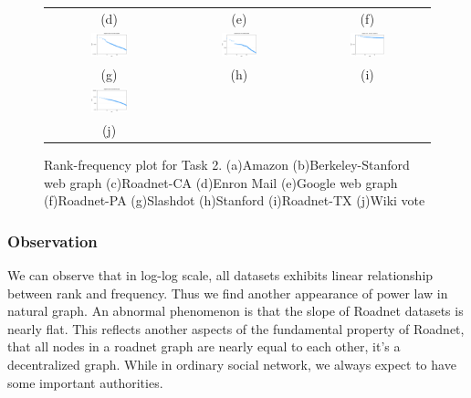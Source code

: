 \begin{figure}[!h]
\begin{center}
\begin{tabular}{c c c}
     (d) & (e) & (f)\\
     \includegraphics[width=0.3\textwidth]{FIG/t2_slashdot.png} &
     \includegraphics[width=0.3\textwidth]{FIG/t2_stanford.png} &
     \includegraphics[width=0.3\textwidth]{FIG/t2_tx.png}\\
     (g) & (h) & (i)\\
     \includegraphics[width=0.3\textwidth]{FIG/t2_wikivote.png} & &\\
     (j) & &
\end{tabular}
\caption{Rank-frequency plot for Task 2. (a)Amazon (b)Berkeley-Stanford web graph (c)Roadnet-CA (d)Enron Mail (e)Google web graph (f)Roadnet-PA (g)Slashdot (h)Stanford (i)Roadnet-TX (j)Wiki vote}
\label{t2:1}
\end{center}
\end{figure}

\subsubsection{Observation}
We can observe that in log-log scale, all datasets exhibits linear relationship between rank and frequency. Thus we find another appearance of power law in natural graph. An abnormal phenomenon is that the slope of Roadnet datasets is nearly flat. This reflects another aspects of the fundamental property of Roadnet, that all nodes in a roadnet graph are nearly equal to each other, it's a decentralized graph. While in ordinary social network, we always expect to have some important authorities. 




